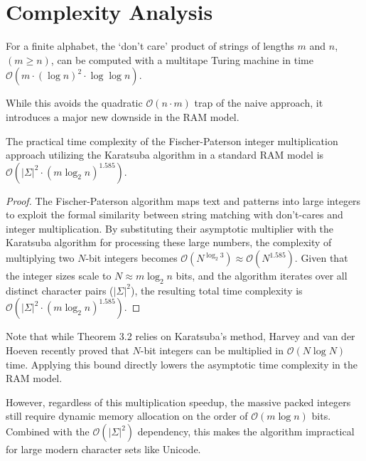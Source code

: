 \section{Complexity Analysis}

\begin{theorem}
For a finite alphabet, the `don't care' product of strings of lengths $m$ and $n$, $(m \ge n)$, can be computed with a multitape Turing machine in time $\mathcal{O}(m \cdot (\log n)^2 \cdot \log \log n)$.
\end{theorem}

While this avoids the quadratic $\mathcal{O}(n \cdot m)$ trap of the naive approach, it introduces a major new downside in the RAM model. 

\begin{theorem}
The practical time complexity of the Fischer-Paterson integer multiplication approach utilizing the Karatsuba algorithm \cite{karatsuba1962} in a standard RAM model is $\mathcal{O}(|\Sigma|^2 \cdot (m \log_2 n)^{1.585})$.
\end{theorem}

\begin{proof}
The Fischer-Paterson algorithm maps text and patterns into large integers to exploit the formal similarity between string matching with don't-cares and integer multiplication. By substituting their asymptotic multiplier with the Karatsuba algorithm \cite{karatsuba1962} for processing these large numbers, the complexity of multiplying two $N$-bit integers becomes $\mathcal{O}(N^{\log_2 3}) \approx \mathcal{O}(N^{1.585})$. Given that the integer sizes scale to $N \approx m \log_2 n$ bits, and the algorithm iterates over all distinct character pairs ($|\Sigma|^2$), the resulting total time complexity is $\mathcal{O}(|\Sigma|^2 \cdot (m \log_2 n)^{1.585})$. 
\end{proof}

Note that while Theorem 3.2 relies on Karatsuba's method, Harvey and van der Hoeven \cite{harvey2021} recently proved that $N$-bit integers can be multiplied in $\mathcal{O}(N \log N)$ time. Applying this bound directly lowers the asymptotic time complexity in the RAM model. 

However, regardless of this multiplication speedup, the massive packed integers still require dynamic memory allocation on the order of $\mathcal{O}(m \log n)$ bits. Combined with the $\mathcal{O}(|\Sigma|^2)$ dependency, this makes the algorithm impractical for large modern character sets like Unicode.

